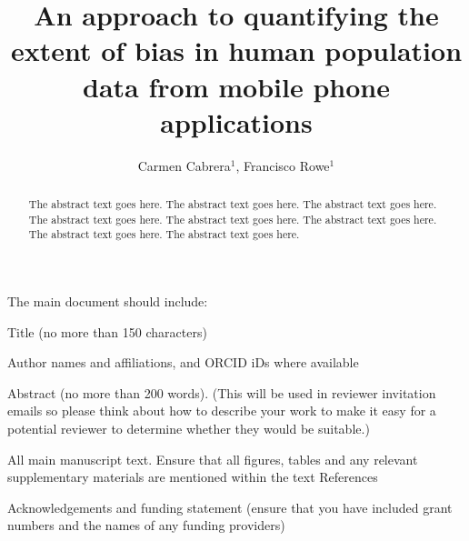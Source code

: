 \documentclass[]{rsos}%
\begin{document}
\title{An approach to quantifying the extent of bias in human population data from mobile phone applications}

\author{
Carmen Cabrera$^{1}$,
Francisco Rowe$^{1}$}

\address{
  $^{1}$Geographic Data Science Lab, Department of Geography and Planning, University of Liverpool, Liverpool, United Kingdom.\\
  $^{}$}
\subject{
subject 1,
subject 2,
subject 3}



\begin{abstract}
The abstract text goes here. The abstract text goes here. The abstract text goes here. The abstract text goes here. The abstract text goes here. The abstract text goes here. The abstract text goes here. The abstract text goes here.
\end{abstract}

\providecommand{\EndFirstPage}{%
}

\maketitle

The main document should include:

Title (no more than 150 characters)

Author names and affiliations, and ORCID iDs where available

Abstract (no more than 200 words). (This will be used in reviewer
invitation emails so please think about how to describe your work to
make it easy for a potential reviewer to determine whether they would be
suitable.)

All main manuscript text. Ensure that all figures, tables and any
relevant supplementary materials are mentioned within the text
References

Acknowledgements and funding statement (ensure that you have included
grant numbers and the names of any funding providers)
\end{document}
